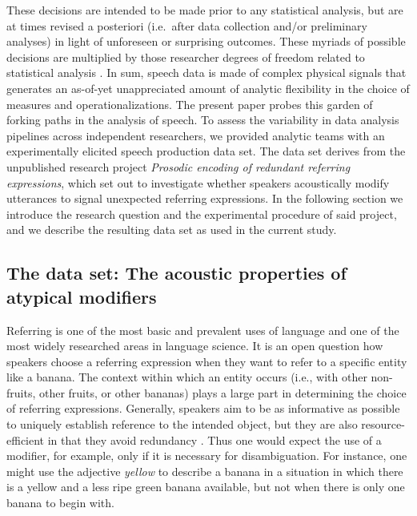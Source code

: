 \documentclass[Review,times,sageh]{sagej}
\begin{document}
These decisions are intended to be made prior to any statistical analysis, but are at times revised a posteriori (i.e.~after data collection and/or preliminary analyses) in light of unforeseen or surprising outcomes.
These myriads of possible decisions are multiplied by those researcher degrees of freedom related to statistical analysis \citep[e.g.][]{wicherts2016}.
In sum, speech data is made of complex physical signals that generates an as-of-yet unappreciated amount of analytic flexibility in the choice of measures and operationalizations.
The present paper probes this garden of forking paths in the analysis of speech.
To assess the variability in data analysis pipelines across independent researchers, we provided analytic teams with an experimentally elicited speech production data set.
The data set derives from the unpublished research project \emph{Prosodic encoding of redundant referring expressions}, which set out to investigate whether speakers acoustically modify utterances to signal unexpected referring expressions.
In the following section we introduce the research question and the experimental procedure of said project, and we describe the resulting data set as used in the current study.

\hypertarget{s:dataset}{%
\subsection{The data set: The acoustic properties of atypical modifiers}\label{s:dataset}}

Referring is one of the most basic and prevalent uses of language and one of the most widely researched areas in language science.
It is an open question how speakers choose a referring expression when they want to refer to a specific entity like a banana.
The context within which an entity occurs (i.e., with other non-fruits, other fruits, or other bananas) plays a large part in determining the choice of referring expressions.
Generally, speakers aim to be as informative as possible to uniquely establish reference to the intended object, but they are also resource-efficient in that they avoid redundancy \citep{grice1975logic}.
Thus one would expect the use of a modifier, for example, only if it is necessary for disambiguation.
For instance, one might use the adjective \emph{yellow} to describe a banana in a situation in which there is a yellow and a less ripe green banana available, but not when there is only one banana to begin with.
\end{document}
